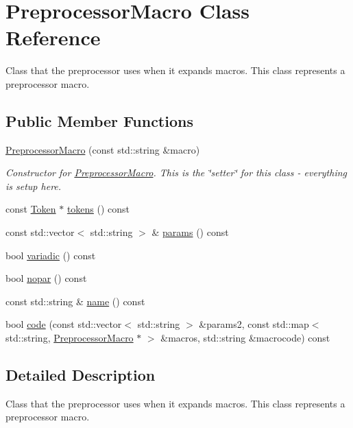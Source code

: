 \hypertarget{class_preprocessor_macro}{\section{Preprocessor\-Macro Class Reference}
\label{class_preprocessor_macro}
}


Class that the preprocessor uses when it expands macros. This class represents a preprocessor macro.  


\subsection*{Public Member Functions}
\begin{DoxyCompactItemize}
\item 
\hyperlink{class_preprocessor_macro_ae2e9d01a7fe3727d399b5093d56b0f07}{Preprocessor\-Macro} (const std\-::string \&macro)
\begin{DoxyCompactList}\small\item\em Constructor for \hyperlink{class_preprocessor_macro}{Preprocessor\-Macro}. This is the \char`\"{}setter\char`\"{} for this class -\/ everything is setup here. \end{DoxyCompactList}\item 
const \hyperlink{class_token}{Token} $\ast$ \hyperlink{class_preprocessor_macro_a7c653a837d6ff695e6c373e413f88e70}{tokens} () const 
\item 
const std\-::vector$<$ std\-::string $>$ \& \hyperlink{class_preprocessor_macro_a958deacfa3e4ef7fd23cdbf0d9dcf98c}{params} () const 
\item 
bool \hyperlink{class_preprocessor_macro_a03fc39a88bc1eb9e09c912cd527ed122}{variadic} () const 
\item 
bool \hyperlink{class_preprocessor_macro_a69479275958acd4a47af5da705431508}{nopar} () const 
\item 
const std\-::string \& \hyperlink{class_preprocessor_macro_aebabbcd86d8323f209c70e673b1e504c}{name} () const 
\item 
bool \hyperlink{class_preprocessor_macro_aed357e83a733c1788deecbc80c7e2bbd}{code} (const std\-::vector$<$ std\-::string $>$ \&params2, const std\-::map$<$ std\-::string, \hyperlink{class_preprocessor_macro}{Preprocessor\-Macro} $\ast$ $>$ \&macros, std\-::string \&macrocode) const 
\end{DoxyCompactItemize}


\subsection{Detailed Description}
Class that the preprocessor uses when it expands macros. This class represents a preprocessor macro. 

